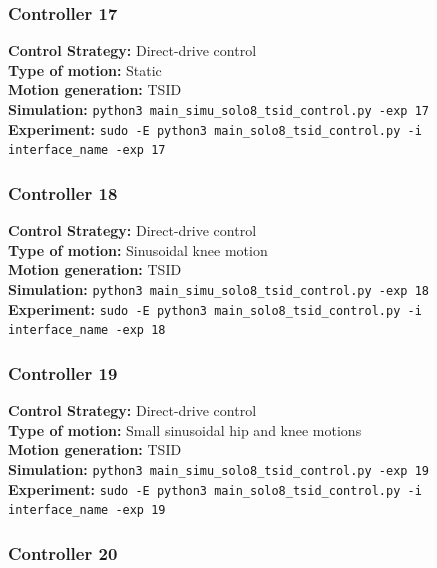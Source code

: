 \documentclass[12pt,a4paper]{article}
\begin{document}
\subsubsection{Controller 17}

\textbf{Control Strategy:} Direct-drive control \\
\textbf{Type of motion:} Static \\
\textbf{Motion generation:} TSID \\
\textbf{Simulation:} \texttt{python3 main\_simu\_solo8\_tsid\_control.py -exp 17} \\
\textbf{Experiment:} \texttt{sudo -E python3 main\_solo8\_tsid\_control.py -i interface\_name -exp 17} \\

\subsubsection{Controller 18}

\textbf{Control Strategy:} Direct-drive control \\
\textbf{Type of motion:} Sinusoidal knee motion \\
\textbf{Motion generation:} TSID \\
\textbf{Simulation:} \texttt{python3 main\_simu\_solo8\_tsid\_control.py -exp 18} \\
\textbf{Experiment:} \texttt{sudo -E python3 main\_solo8\_tsid\_control.py -i interface\_name -exp 18} \\

\subsubsection{Controller 19}

\textbf{Control Strategy:} Direct-drive control \\
\textbf{Type of motion:} Small sinusoidal hip and knee motions \\
\textbf{Motion generation:} TSID \\
\textbf{Simulation:} \texttt{python3 main\_simu\_solo8\_tsid\_control.py -exp 19} \\
\textbf{Experiment:} \texttt{sudo -E python3 main\_solo8\_tsid\_control.py -i interface\_name -exp 19} \\

\subsubsection{Controller 20}
\end{document}
